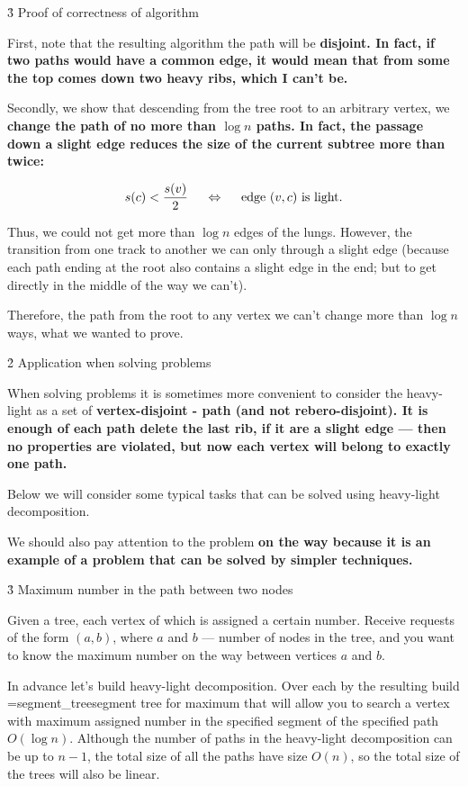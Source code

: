 \h3{ Proof of correctness of algorithm }

First, note that the resulting algorithm the path will be \bf{disjoint}. In fact, if two paths would have a common edge, it would mean that from some the top comes down two heavy ribs, which I can't be.

Secondly, we show that descending from the tree root to an arbitrary vertex, we \bf{change the path of no more than $\log n$ paths}. In fact, the passage down a slight edge reduces the size of the current subtree more than twice:

$$ s(c) < \frac{ s(v) }{ 2 } ~~~~ \Leftrightarrow ~~~~ {\rm edge} ~ (v,c) ~ {\rm is ~ light}. $$

Thus, we could not get more than $\log n$ edges of the lungs. However, the transition from one track to another we can only through a slight edge (because each path ending at the root also contains a slight edge in the end; but to get directly in the middle of the way we can't).

Therefore, the path from the root to any vertex we can't change more than $\log n$ ways, what we wanted to prove.


\h2{ Application when solving problems }

When solving problems it is sometimes more convenient to consider the heavy-light as a set of \bf{vertex-disjoint} - path (and not rebero-disjoint). It is enough of each path delete the last rib, if it are a slight edge --- then no properties are violated, but now each vertex will belong to exactly one path.

Below we will consider some typical tasks that can be solved using heavy-light decomposition.

We should also pay attention to the problem \bf{on the way} because it is an example of a problem that can be solved by simpler techniques.


\h3{ Maximum number in the path between two nodes }

Given a tree, each vertex of which is assigned a certain number. Receive requests of the form $(a,b)$, where $a$ and $b$ --- number of nodes in the tree, and you want to know the maximum number on the way between vertices $a$ and $b$.

In advance let's build heavy-light decomposition. Over each by the resulting build \algohref=segment_tree{segment tree for maximum} that will allow you to search a vertex with maximum assigned number in the specified segment of the specified path $O (\log n)$. Although the number of paths in the heavy-light decomposition can be up to $n-1$, the total size of all the paths have size $O(n)$, so the total size of the trees will also be linear.

